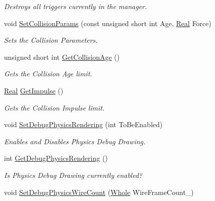 \begin{DoxyCompactItemize}
\begin{DoxyCompactList}\small\item\em Destroys all triggers currently in the manager. \item\end{DoxyCompactList}\item 
void \hyperlink{classphys_1_1PhysicsManager_a98ee9704eec230ff759850ffa8394489}{SetCollisionParams} (const unsigned short int Age, \hyperlink{namespacephys_af7eb897198d265b8e868f45240230d5f}{Real} Force)
\begin{DoxyCompactList}\small\item\em Sets the Collision Parameters. \item\end{DoxyCompactList}\item 
unsigned short int \hyperlink{classphys_1_1PhysicsManager_a4232e8cd52e70b623ef30c40be6cdb4a}{GetCollisionAge} ()
\begin{DoxyCompactList}\small\item\em Gets the Collision Age limit. \item\end{DoxyCompactList}\item 
\hyperlink{namespacephys_af7eb897198d265b8e868f45240230d5f}{Real} \hyperlink{classphys_1_1PhysicsManager_ad11ee3904e1725f95ce9bd58f4ee3925}{GetImpulse} ()
\begin{DoxyCompactList}\small\item\em Gets the Collision Impulse limit. \item\end{DoxyCompactList}\item 
void \hyperlink{classphys_1_1PhysicsManager_a67fb59148a94ced0a92b288a638f89db}{SetDebugPhysicsRendering} (int ToBeEnabled)
\begin{DoxyCompactList}\small\item\em Enables and Disables Physics Debug Drawing. \item\end{DoxyCompactList}\item 
int \hyperlink{classphys_1_1PhysicsManager_a64f96d2e4b25c2b9a66042998bf334ff}{GetDebugPhysicsRendering} ()
\begin{DoxyCompactList}\small\item\em Is Physics Debug Drawing currently enabled? \item\end{DoxyCompactList}\item 
void \hyperlink{classphys_1_1PhysicsManager_ab43a963cf26ca4293a7c34a2a68c4f2c}{SetDebugPhysicsWireCount} (\hyperlink{namespacephys_a460f6bc24c8dd347b05e0366ae34f34a}{Whole} WireFrameCount\_\-)

\end{DoxyCompactItemize}
